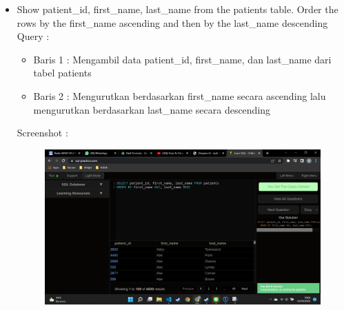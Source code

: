 \documentclass[]{article}
\begin{document}
\begin{itemize}
        \item Show patient\_id, first\_name, last\_name from the patients table.
        Order the rows by the first\_name ascending and then by the last\_name descending
        \\Query :
        
        \begin{itemize}
            \item Baris 1 : Mengambil data patient\_id, first\_name, dan last\_name dari tabel patients
            \item Baris 2 : Mengurutkan berdasarkan first\_name secara ascending lalu mengurutkan berdasarkan last\_name secara descending
        \end{itemize}
        Screenshot :
        \begin{figure}[h]
            \includegraphics[scale=0.3]{./Screenshot/Medium-5.png}
            \centering
        \end{figure}


\end{itemize}
\end{document}
